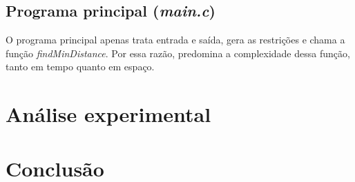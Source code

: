 \documentclass[10pt,a4paper]{article}
\numberwithin{equation}{section}
\begin{document}
\subsection{Programa principal (\emph{main.c})}

O programa principal apenas trata entrada e saída, gera as restrições e chama a função \emph{findMinDistance}. Por essa razão, predomina a complexidade dessa função, tanto em tempo quanto em espaço.

\section{Análise experimental}



\section{Conclusão}
\end{document}

